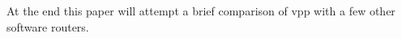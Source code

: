 \small

At the end this paper will attempt a brief comparison of \Ac{vpp} with a few other software routers. 

\blindtext

\blindtext
